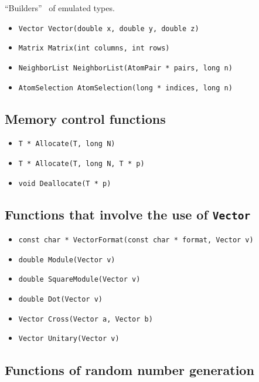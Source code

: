 \documentclass[a4paper,12pt]{article}
\begin{document}
``Builders''\footnotemark ~ of emulated types.

\begin{itemize}
\item \verb'Vector Vector(double x, double y, double z)'
\item \verb'Matrix Matrix(int columns, int rows)'
\item \verb'NeighborList NeighborList(AtomPair * pairs, long n)'
\item \verb'AtomSelection AtomSelection(long * indices, long n)'

\end{itemize}


\subsection{Memory control functions}

\begin{itemize}
\item \verb'T * Allocate(T, long N)'
\item \verb'T * Allocate(T, long N, T * p)'
\item \verb'void Deallocate(T * p)'
\end{itemize}

\subsection{Functions that involve the use of \texttt{Vector}}

\begin{itemize}
\item \verb'const char * VectorFormat(const char * format, Vector v)'
\item \verb'double Module(Vector v)'
\item \verb'double SquareModule(Vector v)'
\item \verb'double Dot(Vector v)'
\item \verb'Vector Cross(Vector a, Vector b)'
\item \verb'Vector Unitary(Vector v)'
\end{itemize}

\subsection{Functions of random number generation}
\end{document}
